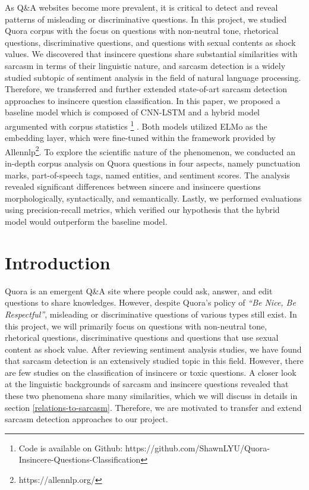 \documentclass[12pt]{diazessay} %
\begin{document}
As Q\&A websites become more prevalent, it is critical to detect and reveal patterns of misleading or discriminative questions. In this project, we studied Quora corpus with the focus on questions with non-neutral tone, rhetorical questions, discriminative questions, and questions with sexual contents as shock values. We discovered that insincere questions share substantial similarities with sarcasm in terms of their linguistic nature, and sarcasm detection is a widely studied subtopic of sentiment analysis in the field of natural language processing. Therefore,  we transferred and further extended state-of-art sarcasm detection approaches to insincere question classification. In this paper, we proposed a baseline model which is composed of CNN-LSTM and a hybrid model argumented with corpus statistics \footnote{Code is available on Github: https://github.com/ShawnLYU/Quora-Insincere-Questions-Classification}
. Both models utilized ELMo \citep{peters2018deep} as the embedding layer, which were fine-tuned within the framework provided by Allennlp\footnote{https://allennlp.org/}. To explore the scientific nature of the phenomenon, we conducted an in-depth corpus analysis on Quora questions in four aspects, namely punctuation marks, part-of-speech tags, named entities, and sentiment scores. The analysis revealed significant differences between sincere and insincere questions morphologically, syntactically, and semantically. Lastly, we performed evaluations using precision-recall metrics, which verified our hypothesis that the hybrid model would outperform the baseline model. 


\section{Introduction}

Quora is an emergent Q\&A site where people could ask, answer, and edit questions to share knowledges. However, despite Quora's policy of \textit{``Be Nice, Be Respectful''}, misleading or discriminative questions of various types still exist. In this project, we will primarily focus on questions with non-neutral tone, rhetorical questions, discriminative questions and questions that use sexual content as shock value. After reviewing sentiment analysis studies, we have found that sarcasm detection is an extensively studied topic in this field. However, there are few studies on the classification of insincere or toxic questions. A closer look at the linguistic backgrounds of sarcasm and insincere questions revealed that these two phenomena share many similarities, which we will discuss in details in section \ref{relations-to-sarcasm}. Therefore, we are motivated to transfer and extend sarcasm detection approaches to our project. 
\end{document}
